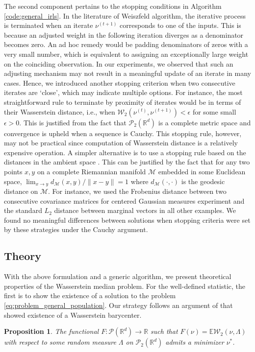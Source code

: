 \documentclass[11pt]{article}
\newcommand{\calM}{\mathcal{M}}
\newcommand{\calP}{\mathcal{P}}
\newcommand{\calW}{\mathcal{W}}
\newcommand{\bbR}{\mathbb{R}}
\newcommand{\bbE}{\mathbb{E}}
\newcommand{\Rd}{\mathbb{R}^d}
\newtheorem{proposition}[theorem]{Proposition}
\begin{document}
The second component pertains to the  stopping conditions in Algorithm \ref{code:general_irls}. In the literature of Weiszfeld algorithm, the iterative process is terminated when an iterate $\nu^{(t+1)}$ corresponds to one of the inputs. This is because an adjusted weight in the following iteration diverges as a denominator becomes zero. An ad hoc remedy would be padding denominators of zeros with a very small number, which is equivalent to assigning an exceptionally large weight on the coinciding observation. In our experiments, we observed that such an adjusting mechanism may not result in a meaningful update of an iterate in many cases. Hence, we introduced another stopping criterion when two consecutive iterates are
`close', which may indicate multiple options. For instance, the most straightforward rule to terminate by proximity of iterates would be in terms of their Wasserstein distance, i.e., when $\calW_2 (\nu^{(t)}, \nu^{(t+1)}) < \epsilon$ for some small $\epsilon > 0$. This is justified from the fact that $\calP_2 (\bbR^d)$ is a complete metric space and convergence is upheld when a sequence is Cauchy. This stopping rule, however, may not be practical since computation of Wasserstein distance is a relatively expensive operation. A simpler alternative is to use a stopping rule based on the distances in the ambient space \citep{you_2022_ParameterEstimationModelbased}. This can be justified by the fact that for any two points $x,y$ on a complete Riemannian manifold $\calM$ embedded in some Euclidean space, $\lim_{x \rightarrow y} d_\calM(x,y)/\|x-y\| = 1$ where $d_\calM(\cdot, \cdot)$ is the geodesic distance on $\calM$. For instance, we used the Frobenius distance between two consecutive covariance matrices for centered Gaussian measures experiment and the standard $L_2$ distance between marginal vectors in all other examples. We found no meaningful differences between solutions when stopping criteria were set by these strategies under the Cauchy argument.



\subsection{Theory}
With the above formulation and a generic algorithm, we present theoretical properties of the Wasserstein median problem. For the well-defined statistic, the first is to show  the existence of a solution to the problem \eqref{eq:problem_general_population}. Our strategy follows an argument of \cite{bigot_2018_CharacterizationBarycentersWasserstein} that showed existence of a Wasserstein barycenter.
\begin{proposition}\label{theory:median_existence}
	The functional $F:\calP(\bbR^d)\rightarrow\bbR$ such that $F(\nu) = \bbE \calW_2 (\nu, \Lambda)$ with respect to some random measure $\Lambda$ on $\calP_2(\Rd)$ admits a minimizer $\nu^*$.	
\end{proposition}
\end{document}
